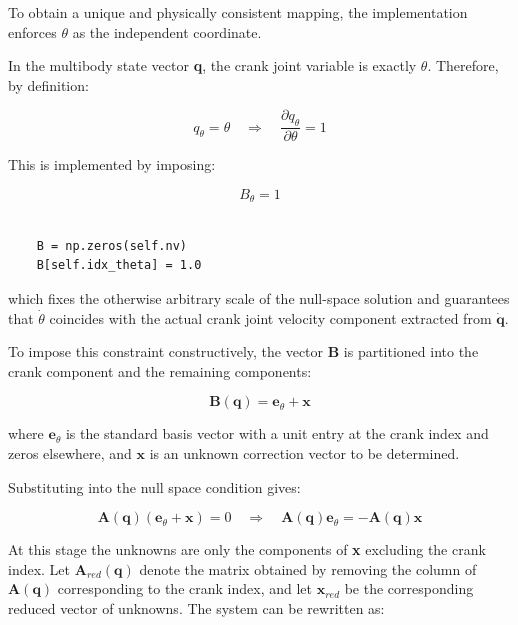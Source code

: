 To obtain a unique and physically consistent mapping, the implementation enforces $\theta$ as the independent coordinate.

In the multibody state vector \textbf{q}, the crank joint variable is exactly $\theta$. Therefore, by definition:

\begin{equation*}
    q_{\theta} = \theta 
\quad \Rightarrow \quad
    \frac{\partial q_{\theta}}{\partial \theta} = 1
\end{equation*}

This is implemented by imposing:

\begin{equation*}
    B_{\theta} = 1
\end{equation*}

\begin{verbatim}

    B = np.zeros(self.nv)
    B[self.idx_theta] = 1.0

\end{verbatim}

which fixes the otherwise arbitrary scale of the null-space solution and guarantees that $\dot{\theta}$ coincides with the actual crank joint velocity component extracted from $\dot{\textbf{q}}$.

To impose this constraint constructively, the vector $\textbf{B}$ is partitioned into the crank component and the remaining components:

\begin{equation*}
    \textbf{B}(\textbf{q}) = \textbf{e}_{\theta} + \textbf{x}
\end{equation*}

where $\textbf{e}_{\theta}$ is the standard basis vector with a unit entry at the crank index and zeros elsewhere, and $\textbf{x}$ is an unknown correction vector to be determined.

Substituting into the null space condition gives:

\begin{equation*}
    \textbf{A}(\textbf{q})(\textbf{e}_{\theta} + \textbf{x}) = 0
    \quad \Rightarrow \quad
    \textbf{A}(\textbf{q})\textbf{e}_{\theta} =  -\textbf{A}(\textbf{q})\textbf{x}
\end{equation*}

At this stage the unknowns are only the components of \textbf{x} excluding the crank index. Let $\textbf{A}_{red}(\textbf{q})$ denote the matrix obtained by removing the column of $\textbf{A}(\textbf{q})$ corresponding to the crank index, and let $\textbf{x}_{red}$ be the corresponding reduced vector of unknowns. The system can be rewritten as:

